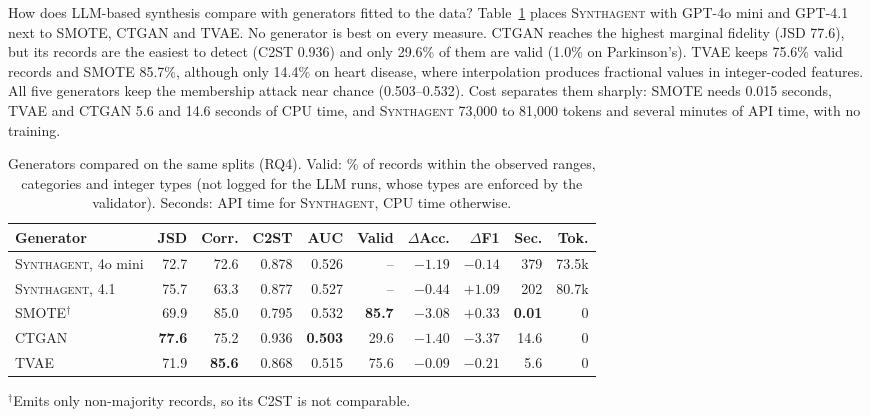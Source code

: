 \documentclass[conference]{IEEEtran}
\newcommand{\system}{\textsc{Synthagent}\xspace}
\newcommand{\best}[1]{\textbf{#1}}
\begin{document}
How does LLM-based synthesis compare with generators fitted to the data? Table~\ref{tab:generators} places \system with GPT-4o mini and GPT-4.1 next to SMOTE, CTGAN and TVAE. No generator is best on every measure. CTGAN reaches the highest marginal fidelity (JSD 77.6), but its records are the easiest to detect (C2ST 0.936) and only 29.6\% of them are valid (1.0\% on Parkinson's). TVAE keeps 75.6\% valid records and SMOTE 85.7\%, although only 14.4\% on heart disease, where interpolation produces fractional values in integer-coded features. All five generators keep the membership attack near chance (0.503--0.532). Cost separates them sharply: SMOTE needs 0.015 seconds, TVAE and CTGAN 5.6 and 14.6 seconds of CPU time, and \system 73,000 to 81,000 tokens and several minutes of API time, with no training.

\begin{table}[t]
\centering
\caption{Generators compared on the same splits (RQ4). Valid: \% of records within the observed ranges, categories and integer types (not logged for the LLM runs, whose types are enforced by the validator). Seconds: API time for \system, CPU time otherwise.}
\label{tab:generators}
\scriptsize
\setlength{\tabcolsep}{1.5pt}
\begin{tabular*}{\columnwidth}{@{\extracolsep{\fill}}lrrrrrrrrr@{}}
\toprule
Generator & JSD & Corr. & C2ST & AUC & Valid & $\Delta$Acc. & $\Delta$F1 & Sec. & Tok. \\
\midrule
\system, 4o mini & 72.7 & 72.6 & 0.878 & 0.526 & -- & $-1.19$ & $-0.14$ & 379 & 73.5k \\
\system, 4.1 & 75.7 & 63.3 & 0.877 & 0.527 & -- & $-0.44$ & \best{$+1.09$} & 202 & 80.7k \\
SMOTE$^{\dagger}$ & 69.9 & 85.0 & 0.795 & 0.532 & \best{85.7} & $-3.08$ & $+0.33$ & \best{0.01} & 0 \\
CTGAN & \best{77.6} & 75.2 & 0.936 & \best{0.503} & 29.6 & $-1.40$ & $-3.37$ & 14.6 & 0 \\
TVAE & 71.9 & \best{85.6} & 0.868 & 0.515 & 75.6 & \best{$-0.09$} & $-0.21$ & 5.6 & 0 \\
\bottomrule
\end{tabular*}
\par\vspace{2pt}\raggedright\scriptsize $^{\dagger}$Emits only non-majority records, so its C2ST is not comparable.
\end{table}
\end{document}

